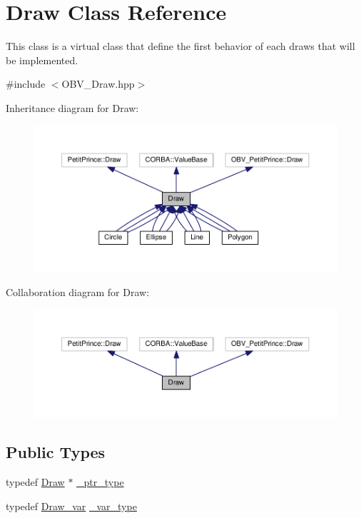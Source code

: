 \hypertarget{class_draw}{}\section{Draw Class Reference}
\label{class_draw}


This class is a virtual class that define the first behavior of each draws that will be implemented.  




{\ttfamily \#include $<$O\+B\+V\+\_\+\+Draw.\+hpp$>$}



Inheritance diagram for Draw\+:
\nopagebreak
\begin{figure}[H]
\begin{center}
\leavevmode
\includegraphics[width=350pt]{class_draw__inherit__graph}
\end{center}
\end{figure}


Collaboration diagram for Draw\+:
\nopagebreak
\begin{figure}[H]
\begin{center}
\leavevmode
\includegraphics[width=350pt]{class_draw__coll__graph}
\end{center}
\end{figure}
\subsection*{Public Types}
\begin{DoxyCompactItemize}
\item 
typedef \hyperlink{class_draw}{Draw} $\ast$ \hyperlink{class_draw_a5164256572b3c4123ceecd1897c248dd}{\+\_\+ptr\+\_\+type}
\item 
typedef \hyperlink{_petit_prince_8hpp_ad6329853fd4733d5723ae5cc6c8a9f43}{Draw\+\_\+var} \hyperlink{class_draw_a0ef4fbc763491a2013fa08badb5ee934}{\+\_\+var\+\_\+type}
\end{DoxyCompactItemize}
